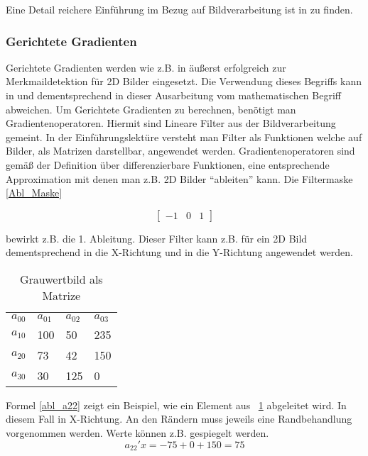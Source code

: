 Eine Detail reichere Einführung im Bezug auf Bildverarbeitung ist in \cite{Priese15} zu finden.

\subsubsection{Gerichtete Gradienten}
Gerichtete Gradienten werden wie z.B. in \cite{dalal2005histograms} äußerst erfolgreich zur Merkmaildetektion für 2D Bilder eingesetzt. Die Verwendung dieses Begriffs kann in \cite{scherer2010histograms} und dementsprechend in dieser Ausarbeitung vom mathematischen Begriff abweichen.
\newline
Um Gerichtete Gradienten zu berechnen, benötigt man Gradientenoperatoren. Hiermit sind Lineare Filter aus der Bildverarbeitung gemeint. In der Einführungslektüre \cite{Priese15} versteht man Filter als Funktionen welche auf Bilder, als Matrizen darstellbar, angewendet werden. Gradientenoperatoren sind gemäß der Definition über differenzierbare Funktionen, eine entsprechende Approximation mit denen man z.B. 2D Bilder "`ableiten"' kann. Die Filtermaske \ref{Abl_Maske} 

\begin{equation}
\label{Abl_Maske}
\begin{bmatrix}
-1 & 0 & 1
\end{bmatrix}
\end{equation}

bewirkt z.B. die 1. Ableitung. Dieser Filter kann z.B. für ein 2D Bild dementsprechend in die X-Richtung und in die Y-Richtung angewendet werden. 

\begin{table}[]
	\centering
	\caption{Grauwertbild als Matrize}
	\label{GrauwertMat}
	\begin{tabular}{llll}
		$a_{00}$ & $a_{01}$ & $a_{02}$ & $a_{03}$ \\
		$a_{10}$ & 100    & 50     & 235     \\
		$a_{20}$ & 73     & 42     & 150      \\
		$a_{30}$ & 30     & 125    & 0                     
	\end{tabular}
\end{table}

Formel \ref{abl_a22} zeigt ein Beispiel, wie ein Element aus \tablename~\ref{GrauwertMat} abgeleitet wird. In diesem Fall in X-Richtung. An den Rändern muss jeweils eine Randbehandlung vorgenommen werden. Werte können z.B. gespiegelt werden.
\begin{equation}
\label{abl_a22}
a_{22}'x = -75 + 0 +150 = 75
\end{equation}

